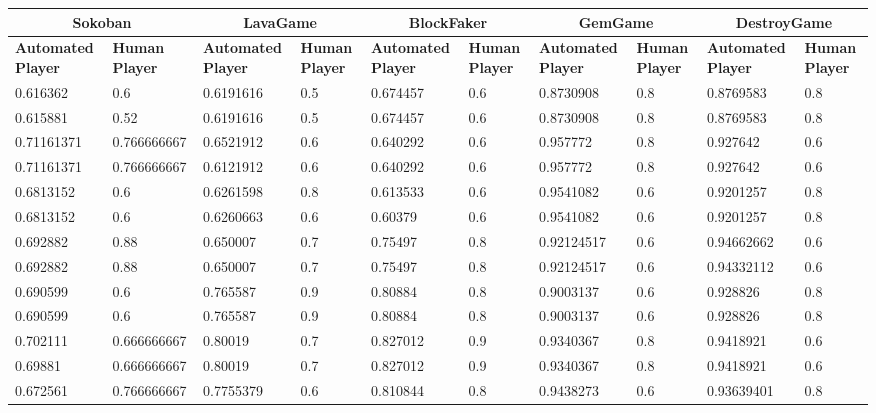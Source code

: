 \begin{landscape}
\begin{table}[!ht]
	\centering
	\begin{tabular}{|p{0.8in}|p{0.8in}|p{0.8in}|p{0.8in}|p{0.8in}|p{0.8in}|p{0.8in}|p{0.8in}|p{0.8in}|p{0.8in}|}
		\hline
		\multicolumn{2}{c}{\textbf{Sokoban}} & \multicolumn{2}{c}{\textbf{LavaGame}} & \multicolumn{2}{c}{\textbf{\textbf{BlockFaker}}} & \multicolumn{2}{c}{\textbf{GemGame}} & \multicolumn{2}{c}{\textbf{DestroyGame}}\\
		\hline
		\textbf{Automated Player} & \textbf{Human Player} & \textbf{Automated Player} & \textbf{Human Player} & \textbf{Automated Player} & \textbf{Human Player} & \textbf{Automated Player} & \textbf{Human Player} & \textbf{Automated Player} & \textbf{Human Player}\\
		\hline
		0.616362 & 0.6 & 0.6191616 & 0.5 & 0.674457 & 0.6 & 0.8730908 & 0.8 & 0.8769583 & 0.8\\
		\hline
		0.615881 & 0.52 & 0.6191616 & 0.5 & 0.674457 & 0.6 & 0.8730908 & 0.8 & 0.8769583 & 0.8\\
		\hline
		0.71161371 & 0.766666667 & 0.6521912 & 0.6 & 0.640292 & 0.6 & 0.957772 & 0.8 & 0.927642 & 0.6\\
		\hline
		0.71161371 & 0.766666667 & 0.6121912 & 0.6 & 0.640292 & 0.6 & 0.957772 & 0.8 & 0.927642 & 0.6\\
		\hline
		0.6813152 & 0.6 & 0.6261598 & 0.8 & 0.613533 & 0.6 & 0.9541082 & 0.6 & 0.9201257 & 0.8\\
		\hline
		0.6813152 & 0.6 & 0.6260663 & 0.6 & 0.60379 & 0.6 & 0.9541082 & 0.6 & 0.9201257 & 0.8\\
		\hline
		0.692882 & 0.88 & 0.650007 & 0.7 & 0.75497 & 0.8 & 0.92124517 & 0.6 & 0.94662662 & 0.6\\
		\hline
		0.692882 & 0.88 & 0.650007 & 0.7 & 0.75497 & 0.8 & 0.92124517 & 0.6 & 0.94332112 & 0.6\\
		\hline
		0.690599 & 0.6 & 0.765587 & 0.9 & 0.80884 & 0.8 & 0.9003137 & 0.6 & 0.928826 & 0.8\\
		\hline
		0.690599 & 0.6 & 0.765587 & 0.9 & 0.80884 & 0.8 & 0.9003137 & 0.6 & 0.928826 & 0.8\\
		\hline
		0.702111 & 0.666666667 & 0.80019 & 0.7 & 0.827012 & 0.9 & 0.9340367 & 0.8 & 0.9418921 & 0.6\\
		\hline
		0.69881 & 0.666666667 & 0.80019 & 0.7 & 0.827012 & 0.9 & 0.9340367 & 0.8 & 0.9418921 & 0.6\\
		\hline
		0.672561 & 0.766666667 & 0.7755379 & 0.6 & 0.810844 & 0.8 & 0.9438273 & 0.6 & 0.93639401 & 0.8\\

\end{tabular}
\end{table}
\end{landscape}
